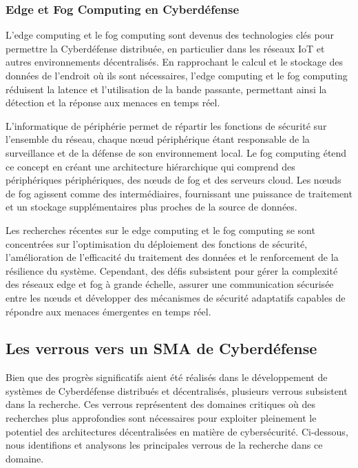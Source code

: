 \subsubsection{Edge et Fog Computing en Cyberdéfense}

L'edge computing et le fog computing sont devenus des technologies clés pour permettre la Cyberdéfense distribuée, en particulier dans les réseaux IoT et autres environnements décentralisés. En rapprochant le calcul et le stockage des données de l'endroit où ils sont nécessaires, l'edge computing et le fog computing réduisent la latence et l'utilisation de la bande passante, permettant ainsi la détection et la réponse aux menaces en temps réel.

L'informatique de périphérie permet de répartir les fonctions de sécurité sur l'ensemble du réseau, chaque nœud périphérique étant responsable de la surveillance et de la défense de son environnement local. Le fog computing étend ce concept en créant une architecture hiérarchique qui comprend des périphériques périphériques, des nœuds de fog et des serveurs cloud. Les nœuds de fog agissent comme des intermédiaires, fournissant une puissance de traitement et un stockage supplémentaires plus proches de la source de données.

Les recherches récentes sur le edge computing et le fog computing se sont concentrées sur l'optimisation du déploiement des fonctions de sécurité, l'amélioration de l'efficacité du traitement des données et le renforcement de la résilience du système. Cependant, des défis subsistent pour gérer la complexité des réseaux edge et fog à grande échelle, assurer une communication sécurisée entre les nœuds et développer des mécanismes de sécurité adaptatifs capables de répondre aux menaces émergentes en temps réel.

\subsection{Les verrous vers un SMA de Cyberdéfense}

Bien que des progrès significatifs aient été réalisés dans le développement de systèmes de Cyberdéfense distribués et décentralisés, plusieurs verrous subsistent dans la recherche. Ces verrous représentent des domaines critiques où des recherches plus approfondies sont nécessaires pour exploiter pleinement le potentiel des architectures décentralisées en matière de cybersécurité. Ci-dessous, nous identifions et analysons les principales verrous de la recherche dans ce domaine.

